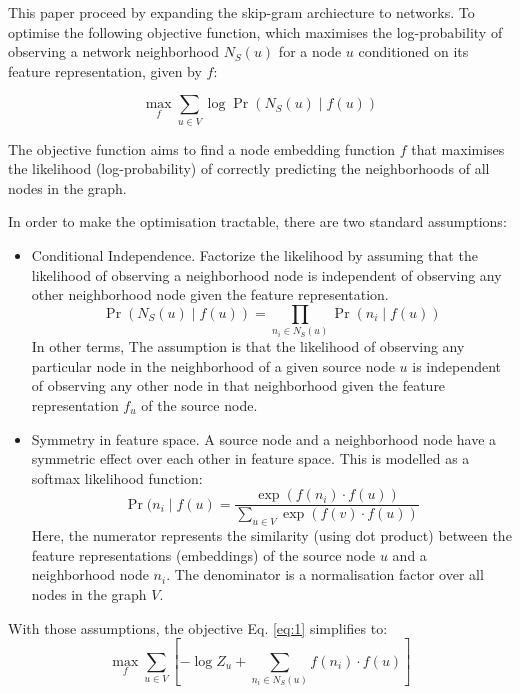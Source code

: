 \documentclass{article}
\begin{document}
This paper proceed by expanding the skip-gram archiecture to networks. To
optimise the following objective function, which maximises the log-probability
of observing a network neighborhood $N_S (u)$ for a node $u$ conditioned on its
feature representation, given by $f$:

\begin{equation} 
  \max_f \sum_{u \in V} \log \Pr(N_S (u) \mid f (u))
  \label{eq:1}
\end{equation}

The objective function aims to find a node embedding function $f$ that
maximises the likelihood (log-probability) of correctly predicting the
neighborhoods of all nodes in the graph.

In order to make the optimisation tractable, there are two standard
assumptions: 
\begin{itemize} 
  \item Conditional Independence. Factorize the likelihood by assuming that the
    likelihood of observing a neighborhood node is independent of observing any
    other neighborhood node given the feature representation.
    \begin{equation}
      \Pr(N_S(u) \mid f (u)) = \prod_{n_i \in N_S(u)}\Pr(n_i \mid f(u))
      \label{eq:2}
    \end{equation}
    In other terms, The assumption is that the likelihood of observing any
    particular node in the neighborhood of a given source node $u$ is independent
    of observing any other node in that neighborhood given the feature
    representation $f_u$ of the source node.

  \item Symmetry in feature space. A source node and a neighborhood node have a
    symmetric effect over each other in feature space.
    This is modelled as a softmax likelihood function:
    \begin{equation}
      \Pr(n_i \mid f(u) = \frac{\exp(f(n_i) \cdot f(u))}{\sum_{u \in V} \exp(f(v) \cdot f(u))}
      \label{eq:3}
    \end{equation}
    Here, the numerator represents the similarity (using dot product) between
    the feature representations (embeddings) of the source node $u$ and a
    neighborhood node $n_i$. The denominator is a normalisation factor over all
    nodes in the graph $V$.
\end{itemize}

With those assumptions, the objective Eq. \ref{eq:1} simplifies to:
\begin{equation}
  \max_f \sum_{u \in V}\left[ -\log Z_u + \sum_{n_i \in N_S(u)} f(n_i) \cdot f(u)\right]
  \label{eq:4}
\end{equation}
\end{document}
